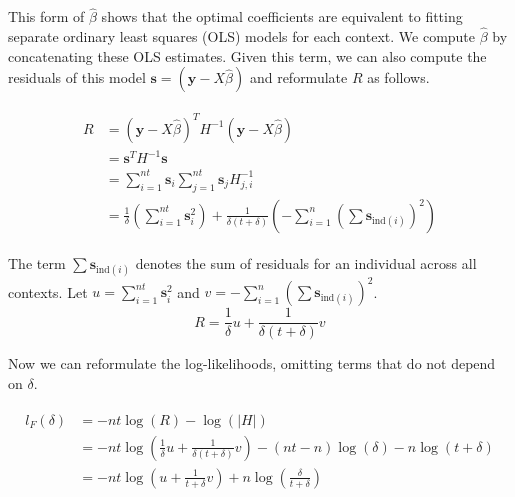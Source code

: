         This form of $\hat{\beta}$ shows that the optimal coefficients are equivalent to fitting separate ordinary least squares (OLS) models for each context. We compute $\hat{\beta}$ by concatenating these OLS estimates. Given this term, we can also compute the residuals of this model $\mathbf{s} = (\mathbf{y} - X\hat{\beta})$ and reformulate $R$ as follows.
        
        \begin{align}
        \begin{split}
            R & = (\mathbf{y} - X\hat{\beta})^TH^{-1}(\mathbf{y} - X\hat{\beta}) \\
              & = \mathbf{s}^TH^{-1}\mathbf{s} \\
              & = \sum_{i=1}^{nt}\mathbf{s}_i \sum_{j=1}^{nt} \mathbf{s}_j H^{-1}_{j,i} \\
              & = \frac{1}{\delta} \left(\sum_{i=1}^{nt} \mathbf{s}_i^2 \right) + \frac{1}{\delta(t + \delta)} \left(-\sum_{i=1}^{n} \left(\sum \mathbf{s}_{\text{ind}(i)}\right)^2\right)
        \end{split}
        \end{align}
    
        The term $ \sum \mathbf{s}_{\text{ind}(i)} $ denotes the sum of residuals for an individual across all contexts. Let $u = \sum_{i=1}^{nt} \mathbf{s}_i^2$ and $v = -\sum_{i=1}^{n} \left(\sum \mathbf{s}_{\text{ind}(i)}\right)^2$.
        \begin{equation}
            R = \frac{1}{\delta}u + \frac{1}{\delta(t + \delta)} v
        \end{equation}
        
        Now we can reformulate the log-likelihoods, omitting terms that do not depend on $\delta$.
        
        \begin{align}
        \begin{split}
            l_F(\delta) & = -nt\log{(R)} - \log(|H|) \\
                        & = -nt\log{\left(\frac{1}{\delta}u + \frac{1}{\delta(t + \delta)} v\right)} - (nt - n)\log{(\delta)} - n\log{(t+\delta)} \\
                        & = -nt\log{\left(u + \frac{1}{t+\delta} v\right)} + n \log{\left(\frac{\delta}{t+\delta}\right)}
        \end{split}
        \end{align}
        
